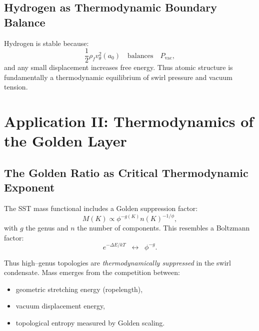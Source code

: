 \documentclass[11pt]{article}
\newcommand{\rhof}{\rho_{\!f}} \newcommand{\rhoF}{\rho_{\!f}}                             %
\begin{document}
        \subsection{Hydrogen as Thermodynamic Boundary Balance}

            Hydrogen is stable because:
            \begin{equation}
                \frac12 \rhof v_\theta^2(a_0)
                \quad \text{balances} \quad
                P_{\mathrm{vac}},
            \end{equation}
            and any small displacement increases free energy.
            Thus atomic structure is fundamentally a thermodynamic equilibrium of swirl
            pressure and vacuum tension.

    \section{Application II: Thermodynamics of the Golden Layer}

        \subsection{The Golden Ratio as Critical Thermodynamic Exponent}

            The SST mass functional includes a Golden suppression factor:
            \begin{equation}
                M(K) \propto \phi^{-g(K)} n(K)^{-1/\phi},
            \end{equation}
            with $g$ the genus and $n$ the number of components.
            This resembles a Boltzmann factor:
            \begin{equation}
                e^{-\Delta E / kT}
                \;\; \leftrightarrow \;\;
                \phi^{-g}.
            \end{equation}

            Thus high--genus topologies are \emph{thermodynamically suppressed} in the swirl
            condensate. Mass emerges from the competition between:
            \begin{itemize}
                \item geometric stretching energy (ropelength),
                \item vacuum displacement energy,
                \item topological entropy measured by Golden scaling.
            \end{itemize}
\end{document}
